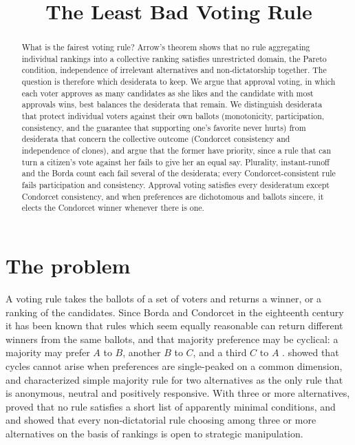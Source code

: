 \documentclass{situationist-preprint}
\title{The Least Bad Voting Rule}
\begin{document}
\maketitle

\begin{abstract}
What is the fairest voting rule? Arrow's theorem shows that no rule aggregating individual rankings into a collective ranking satisfies unrestricted domain, the Pareto condition, independence of irrelevant alternatives and non-dictatorship together. The question is therefore which desiderata to keep. We argue that approval voting, in which each voter approves as many candidates as she likes and the candidate with most approvals wins, best balances the desiderata that remain. We distinguish desiderata that protect individual voters against their own ballots (monotonicity, participation, consistency, and the guarantee that supporting one's favorite never hurts) from desiderata that concern the collective outcome (Condorcet consistency and independence of clones), and argue that the former have priority, since a rule that can turn a citizen's vote against her fails to give her an equal say. Plurality, instant-runoff and the Borda count each fail several of the desiderata; every Condorcet-consistent rule fails participation and consistency. Approval voting satisfies every desideratum except Condorcet consistency, and when preferences are dichotomous and ballots sincere, it elects the Condorcet winner whenever there is one.
\end{abstract}

\section{The problem}

A voting rule takes the ballots of a set of voters and returns a winner, or a ranking of the candidates. Since Borda and Condorcet in the eighteenth century it has been known that rules which seem equally reasonable can return different winners from the same ballots, and that majority preference may be cyclical: a majority may prefer $A$ to $B$, another $B$ to $C$, and a third $C$ to $A$ \citep{Condorcet1785}. \citet{Black1948} showed that cycles cannot arise when preferences are single-peaked on a common dimension, and \citet{May1952} characterized simple majority rule for two alternatives as the only rule that is anonymous, neutral and positively responsive. With three or more alternatives, \citet{Arrow1951} proved that no rule satisfies a short list of apparently minimal conditions, and \citet{Gibbard1973} and \citet{Satterthwaite1975} showed that every non-dictatorial rule choosing among three or more alternatives on the basis of rankings is open to strategic manipulation.
\end{document}
